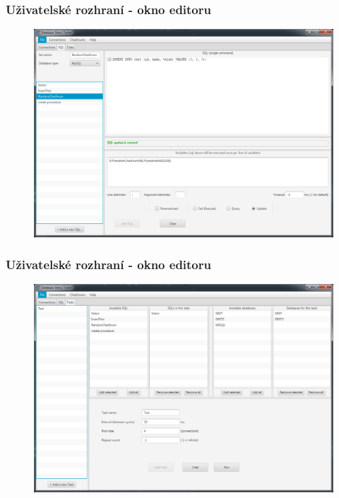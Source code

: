 \documentclass{beamer}
\begin{document}
\begin{frame}
  \frametitle{Uživatelské rozhraní - okno editoru}
  \begin{figure}[h]
\centering
\includegraphics[width=1.0\textwidth]{img/sqleditor.png}
\end{figure}

\end{frame}


\begin{frame}
  \frametitle{Uživatelské rozhraní - okno editoru}
  \begin{figure}[h]
\centering
\includegraphics[width=1.0\textwidth]{img/taskeditor.png}
\end{figure}

\end{frame}
\end{document}

